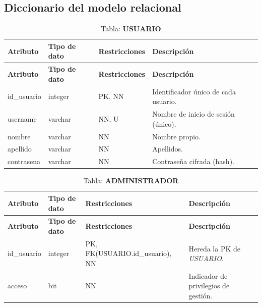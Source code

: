 \newpage

\subsection{Diccionario del modelo relacional}

\renewcommand{\arraystretch}{1.25}

\begin{longtable}{|l|l|p{5cm}|p{5cm}|}
\caption{Tabla: \textbf{USUARIO}}\\ \hline
\textbf{Atributo} & \textbf{Tipo de dato} & \textbf{Restricciones} & \textbf{Descripción} \\ \hline
\endfirsthead
\hline \textbf{Atributo} & \textbf{Tipo de dato} & \textbf{Restricciones} & \textbf{Descripción} \\ \hline
\endhead
id\_usuario & integer & PK, NN & Identificador único de cada usuario. \\ \hline
username    & varchar & NN, U  & Nombre de inicio de sesión (único). \\ \hline
nombre      & varchar & NN     & Nombre propio. \\ \hline
apellido    & varchar & NN     & Apellidos. \\ \hline
contrasena  & varchar & NN     & Contraseña cifrada (hash). \\ \hline
\end{longtable}

\begin{longtable}{|l|l|p{5cm}|p{5cm}|}
\caption{Tabla: \textbf{ADMINISTRADOR}}\\ \hline
\textbf{Atributo} & \textbf{Tipo de dato} & \textbf{Restricciones} & \textbf{Descripción} \\ \hline
\endfirsthead
\hline \textbf{Atributo} & \textbf{Tipo de dato} & \textbf{Restricciones} & \textbf{Descripción} \\ \hline
\endhead
id\_usuario & integer & PK, FK(USUARIO.id\_usuario), NN & Hereda la PK de \textit{USUARIO}. \\ \hline
acceso      & bit     & NN & Indicador de privilegios de gestión. \\ \hline
\end{longtable}

